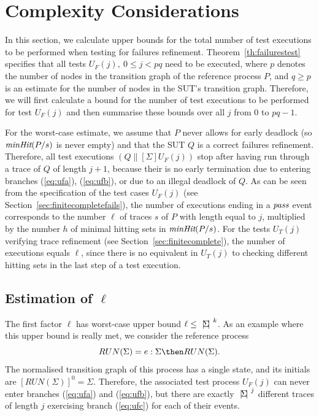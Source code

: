 \section{Complexity Considerations}
\label{sec:complexity}

In this section, we calculate upper bounds for the total number of test
executions to be performed when testing for failures refinement.
Theorem~\ref{th:failurestest} specifies that all tests $U_F(j),\ 0\le j < pq$
need to be executed, where $p$ denotes the number of nodes in the transition
graph of the reference process $P$, and $q\ge p$ is an estimate for the
number of nodes in the SUT's transition graph. Therefore, we will first
calculate a bound for the number of test executions to be performed for test
$U_F(j)$ and then summarise  these bounds over all $j$ from $0$ to $pq-1$.

For the worst-case estimate, we assume that $P$ never allows for early
deadlock (so $\text{\it minHit}(P/s)$ is never empty) and that the SUT $Q$ is a
correct failures refinement. Therefore, all test executions
$(Q\parallel[\Sigma] U_F(j))$ stop after having run through a trace of $Q$ of
length $j+1$, because their is no early termination due to entering branches
(\ref{eq:ufa}), (\ref{eq:ufb}), or due to an illegal deadlock of $Q$. As can
be seen from the specification of the test cases $U_F(j)$ (see
Section~\ref{sec:finitecompletefails}), the number of executions ending in a
${\text{\it pass}}$ event corresponds to the number $\ell$ of traces $s$ of $P$ with
length equal to $j$, multiplied by the number $h$ of minimal hitting sets in
$\text{\it minHit}(P/s)$. For the tests $U_T(j)$ verifying trace refinement (see
Section~\ref{sec:finitecomplete}), the number of executions equals $\ell$,
since there is no equivalent in $U_T(j)$ to checking different hitting sets
in the last step of a test execution.  

\subsection{Estimation of $\ell$}
The first factor $\ell$ has worst-case upper bound $\ell\le {~|\! \Sigma\!|~}^k$.
As an example where this upper bound is really met, we consider the reference
process
\[
RUN(\Sigma) = e:\Sigma \then RUN(\Sigma).
\]
The normalised transition graph of this process has a single state, and its initials
are $[RUN(\Sigma)]^0 = \Sigma$. Therefore, the associated test process $U_F(j)$ can
never enter branches (\ref{eq:ufa}) and (\ref{eq:ufb}), but there are exactly
${~|\! \Sigma\!|~}^j$ different traces of length $j$ exercising branch (\ref{eq:ufc})
for each of their events.

